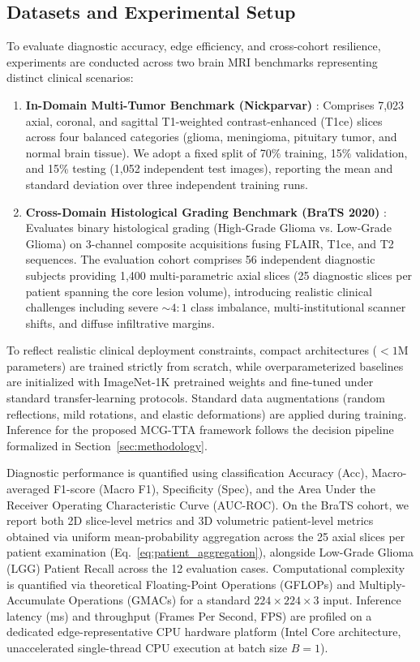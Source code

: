 \documentclass[journal]{IEEEtran}
\begin{document}
\subsection{Datasets and Experimental Setup}

To evaluate diagnostic accuracy, edge efficiency, and cross-cohort resilience, experiments are conducted across two brain MRI benchmarks representing distinct clinical scenarios:
\begin{enumerate}
    \item \textbf{In-Domain Multi-Tumor Benchmark (Nickparvar)} \cite{26}: Comprises 7,023 axial, coronal, and sagittal T1-weighted contrast-enhanced (T1ce) slices across four balanced categories (glioma, meningioma, pituitary tumor, and normal brain tissue). We adopt a fixed split of 70\% training, 15\% validation, and 15\% testing (1,052 independent test images), reporting the mean and standard deviation over three independent training runs.
    \item \textbf{Cross-Domain Histological Grading Benchmark (BraTS 2020)} \cite{2, 23, 45}: Evaluates binary histological grading (High-Grade Glioma vs. Low-Grade Glioma) on 3-channel composite acquisitions fusing FLAIR, T1ce, and T2 sequences. The evaluation cohort comprises 56 independent diagnostic subjects providing 1,400 multi-parametric axial slices (25 diagnostic slices per patient spanning the core lesion volume), introducing realistic clinical challenges including severe $\sim 4:1$ class imbalance, multi-institutional scanner shifts, and diffuse infiltrative margins.
\end{enumerate}

To reflect realistic clinical deployment constraints, compact architectures ($<1$M parameters) are trained strictly from scratch, while overparameterized baselines are initialized with ImageNet-1K pretrained weights and fine-tuned under standard transfer-learning protocols. Standard data augmentations (random reflections, mild rotations, and elastic deformations) are applied during training. Inference for the proposed MCG-TTA framework follows the decision pipeline formalized in Section~\ref{sec:methodology}.

Diagnostic performance is quantified using classification Accuracy (Acc), Macro-averaged F1-score (Macro F1), Specificity (Spec), and the Area Under the Receiver Operating Characteristic Curve (AUC-ROC). On the BraTS cohort, we report both 2D slice-level metrics and 3D volumetric patient-level metrics obtained via uniform mean-probability aggregation across the 25 axial slices per patient examination (Eq.~\ref{eq:patient_aggregation}), alongside Low-Grade Glioma (LGG) Patient Recall across the 12 evaluation cases. Computational complexity is quantified via theoretical Floating-Point Operations (GFLOPs) and Multiply-Accumulate Operations (GMACs) for a standard $224 \times 224 \times 3$ input. Inference latency (ms) and throughput (Frames Per Second, FPS) are profiled on a dedicated edge-representative CPU hardware platform (Intel Core architecture, unaccelerated single-thread CPU execution at batch size $B=1$).
\end{document}
